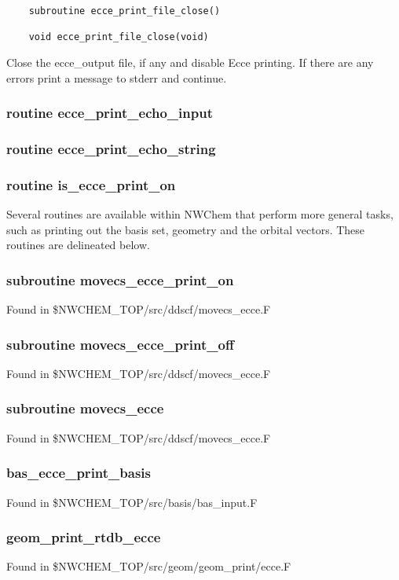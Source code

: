 \begin{verbatim}
    subroutine ecce_print_file_close()

    void ecce_print_file_close(void)
\end{verbatim}
Close the ecce\_output file, if any and disable Ecce printing.  If
there are any errors print a message to stderr and continue.

\subsubsection{ routine ecce\_print\_echo\_input }

\subsubsection{ routine ecce\_print\_echo\_string }

\subsubsection{ routine is\_ecce\_print\_on }


Several routines are available within NWChem that perform more general tasks,
such as printing out the basis set, geometry and the orbital vectors.  These
routines are delineated below.

\subsubsection{ subroutine movecs\_ecce\_print\_on }
Found in \$NWCHEM\_TOP/src/ddscf/movecs\_ecce.F

\subsubsection{ subroutine movecs\_ecce\_print\_off }
Found in \$NWCHEM\_TOP/src/ddscf/movecs\_ecce.F

\subsubsection{ subroutine movecs\_ecce }
Found in \$NWCHEM\_TOP/src/ddscf/movecs\_ecce.F

\subsubsection{ bas\_ecce\_print\_basis }
Found in \$NWCHEM\_TOP/src/basis/bas\_input.F

\subsubsection{ geom\_print\_rtdb\_ecce }
Found in \$NWCHEM\_TOP/src/geom/geom\_print/ecce.F

